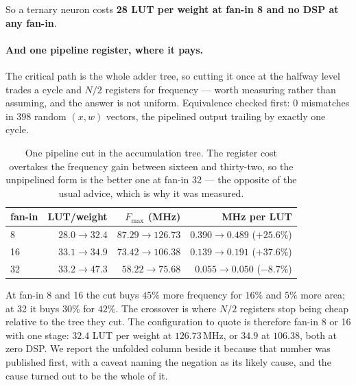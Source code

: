 \documentclass[11pt]{article}
\theoremstyle{definition}
\begin{document}
So a ternary neuron costs \textbf{28 LUT per weight at fan-in 8 and no DSP at
any fan-in}.

\paragraph{And one pipeline register, where it pays.} The critical path is the
whole adder tree, so cutting it once at the halfway level trades a cycle and
$N/2$ registers for frequency --- worth measuring rather than assuming, and the
answer is not uniform. Equivalence checked first: $0$ mismatches in $398$ random
$(x,w)$ vectors, the pipelined output trailing by exactly one cycle.

\begin{table}[t]\centering
\caption{One pipeline cut in the accumulation tree. The register cost overtakes
the frequency gain between sixteen and thirty-two, so the unpipelined form is
the better one at fan-in 32 --- the opposite of the usual advice, which is why it
was measured.}
\label{tab:nodepipe}
\begin{tabular}{lrrr}
\toprule
fan-in & LUT/weight & $F_{\max}$ (MHz) & MHz per LUT \\
\midrule
8  & $28.0\to\mathbf{32.4}$ & $87.29\to\mathbf{126.73}$ & $0.390\to0.489$ (\textbf{$+25.6\%$}) \\
16 & $33.1\to\mathbf{34.9}$ & $73.42\to\mathbf{106.38}$ & $0.139\to0.191$ (\textbf{$+37.6\%$}) \\
32 & $33.2\to47.3$ & $58.22\to75.68$ & $0.055\to0.050$ ($-8.7\%$) \\
\bottomrule
\end{tabular}
\end{table}

At fan-in 8 and 16 the cut buys $45\%$ more frequency for $16\%$ and $5\%$ more
area; at 32 it buys $30\%$ for $42\%$. The crossover is where $N/2$ registers
stop being cheap relative to the tree they cut. The configuration to quote is
therefore fan-in 8 or 16 with one stage: $32.4$ LUT per weight at $126.73$\,MHz,
or $34.9$ at $106.38$, both at zero DSP. We report the unfolded column beside it because that number was
published first, with a caveat naming the negation as its likely cause, and the
cause turned out to be the whole of it.
\end{document}
